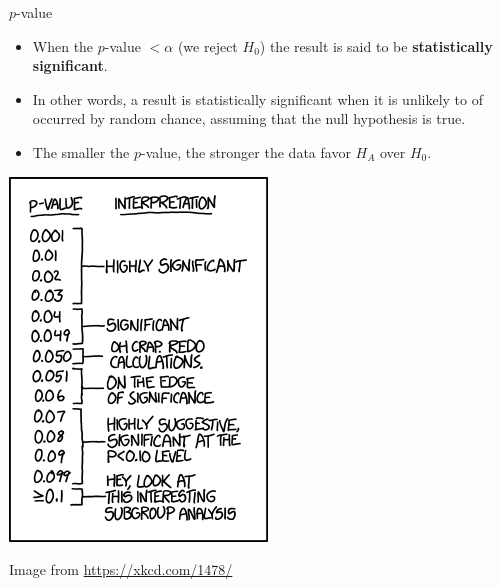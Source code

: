 \documentclass[fleqn, 10pt]{beamer}\usepackage[]{graphicx}\usepackage[]{color}
\begin{document}
\begin{frame}{$p$-value}
\begin{itemize}
\item When the $p$-value $< \alpha$ (we reject $H_0$) the result is said to be \textbf{statistically significant}.
\vspace{10pt}
\item In other words, a result is statistically significant when it is unlikely to of occurred by random chance, assuming that the null hypothesis is true.
\vspace{10pt}
\item The smaller the $p$-value, the stronger the data favor $H_A$ over $H_0$.
\end{itemize}
\end{frame}

\begin{frame}
\begin{center}
\includegraphics[scale=0.5]{figure/xkcd_p_values.png}
\end{center}

Image from \url{https://xkcd.com/1478/}
\end{frame}
\end{document}

